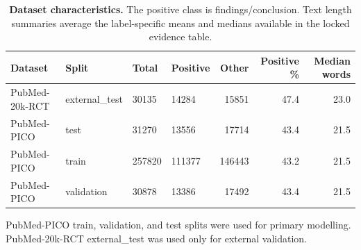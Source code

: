 \begin{table}[!ht]
\centering
\caption{\textbf{Dataset characteristics.} The positive class is findings/conclusion. Text length summaries average the label-specific means and medians available in the locked evidence table.}
\begin{tabular}{llllrrr}
\hline
Dataset & Split & Total & Positive & Other & Positive \% & Median words \\
\hline
PubMed-20k-RCT & external\_test & 30135 & 14284 & 15851 & 47.4 & 23.0 \\
PubMed-PICO & test & 31270 & 13556 & 17714 & 43.4 & 21.5 \\
PubMed-PICO & train & 257820 & 111377 & 146443 & 43.2 & 21.5 \\
PubMed-PICO & validation & 30878 & 13386 & 17492 & 43.4 & 21.5 \\
\hline
\end{tabular}
\begin{flushleft}\footnotesize PubMed-PICO train, validation, and test splits were used for primary modelling. PubMed-20k-RCT external\_test was used only for external validation.\end{flushleft}
\label{tab:dataset}
\end{table}

